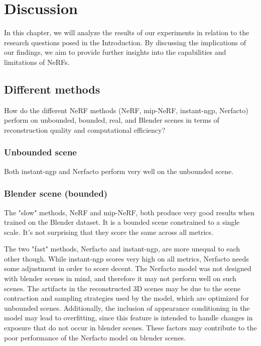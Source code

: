 \begin{comment}
- Loop back to the introduction, review - claim - agenda
    - In this thesis, we have seen how we can reconstruct 3D scenes and render novel views by optimizing NeRFs on 2D input images.
    - The pipeline for creating NeRFs has become greatly simplified recently. As we've seen we can without problems optimize a NeRF in ~4.5 minutes.


Results:
- Dataset size
- Different methods
- Capture method
- NeRF in VR

- Area size
\end{comment}

\chapter{Discussion}
In this chapter, we will analyze the results of our experiments in relation to the research questions posed in the Introduction. By discussing the implications of our findings, we aim to provide further insights into the capabilities and limitations of NeRFs.


\section{Different methods}
\begin{description}[leftmargin=!,labelwidth=\widthof{RQ 1:}]
\item[\textbf{RQ 1:}]
How do the different NeRF methods (NeRF, mip-NeRF, instant-ngp, Nerfacto) perform on unbounded, bounded, real, and Blender scenes in terms of reconstruction quality and computational efficiency?
\end{description}

\subsection{Unbounded scene}
Both instant-ngp and Nerfacto perform very well on the unbounded scene. 

\subsection{Blender scene (bounded)}
The "slow" methods, NeRF and mip-NeRF, both produce very good results when trained on the Blender dataset. It is a bounded scene constrained to a single scale. It's not surprising that they score the same across all metrics.

The two "fast" methods, Nerfacto and instant-ngp, are more unequal to each other though. While instant-ngp scores very high on all metrics, Nerfacto needs some adjustment in order to score decent. The Nerfacto model was not designed with blender scenes in mind, and therefore it may not perform well on such scenes. The artifacts in the reconstructed 3D scenes may be due to the scene contraction and sampling strategies used by the model, which are optimized for unbounded scenes. Additionally, the inclusion of appearance conditioning in the model may lead to overfitting, since this feature is intended to handle changes in exposure that do not occur in blender scenes. These factors may contribute to the poor performance of the Nerfacto model on blender scenes.

